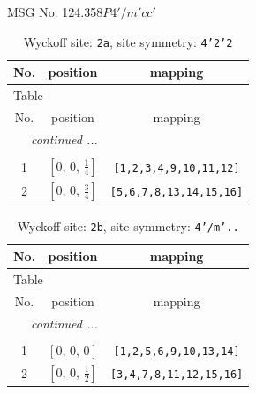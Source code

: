 \documentclass[fleqn,8pt]{jsarticle}
\begin{document}
\setcounter{MaxMatrixCols}{32}

\renewcommand{\tablename}{Table~}
\renewcommand{\figurename}{Figure~}
\begin{center}
\LARGE
MSG No. 124.358\quad$P4'/m'cc'$
\end{center}
\renewcommand{\arraystretch}{1.2}
\begin{longtable}{ccc}
\caption{Wyckoff site: {\tt 2a}, site symmetry: {\tt 4'2'2}}
 \\
 \hline \hline
No. & position & mapping \\ \hline \endfirsthead

\multicolumn{2}{l}{\tablename\ \thetable{}} \\
 \hline \hline
No. & position & mapping \\ \hline \endhead

 \hline \hline
\multicolumn{2}{r}{\footnotesize\it continued ...} \\ \endfoot

 \hline \hline
\multicolumn{2}{r}{} \\ \endlastfoot

1 & $\left[ 0,\, 0,\, \frac{1}{4} \right]$ & {\tt [1,2,3,4,9,10,11,12]} \\ \hline
2 & $\left[ 0,\, 0,\, \frac{3}{4} \right]$ & {\tt [5,6,7,8,13,14,15,16]} \\
\end{longtable}
\renewcommand{\arraystretch}{1.2}
\begin{longtable}{ccc}
\caption{Wyckoff site: {\tt 2b}, site symmetry: {\tt 4'/m'..}}
 \\
 \hline \hline
No. & position & mapping \\ \hline \endfirsthead

\multicolumn{2}{l}{\tablename\ \thetable{}} \\
 \hline \hline
No. & position & mapping \\ \hline \endhead

 \hline \hline
\multicolumn{2}{r}{\footnotesize\it continued ...} \\ \endfoot

 \hline \hline
\multicolumn{2}{r}{} \\ \endlastfoot

1 & $\left[ 0,\, 0,\, 0 \right]$ & {\tt [1,2,5,6,9,10,13,14]} \\ \hline
2 & $\left[ 0,\, 0,\, \frac{1}{2} \right]$ & {\tt [3,4,7,8,11,12,15,16]} \\
\end{longtable}
\end{document}
